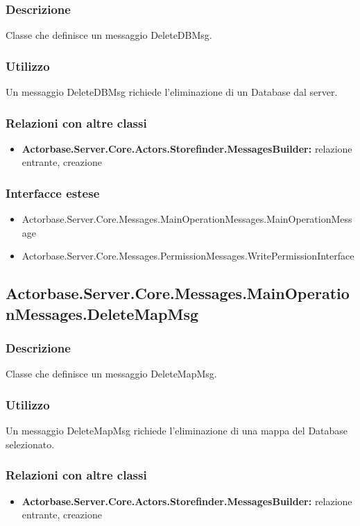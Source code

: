 \documentclass[a4paper]{article}
\begin{document}
			\subsubsection{Descrizione}
				Classe che definisce un messaggio DeleteDBMsg.
			\subsubsection{Utilizzo}
				Un messaggio DeleteDBMsg richiede l'eliminazione di un Database dal server.
			\subsubsection{Relazioni con altre classi}
			\begin{itemize}
				\item \textbf{Actorbase.Server.Core.Actors.Storefinder.MessagesBuilder:} relazione entrante, creazione
			\end{itemize}
			\subsubsection{Interfacce estese}
			\begin{itemize}
				\item Actorbase.Server.Core.Messages.MainOperationMessages.MainOperationMessage
				\item Actorbase.Server.Core.Messages.PermissionMessages.WritePermissionInterface
			\end{itemize}

			\subsection{Actorbase.Server.Core.Messages.MainOperationMessages.DeleteMapMsg}
			\subsubsection{Descrizione}
				Classe che definisce un messaggio DeleteMapMsg.
			\subsubsection{Utilizzo}
				Un messaggio DeleteMapMsg richiede l'eliminazione di una mappa del Database selezionato.
			\subsubsection{Relazioni con altre classi}
			\begin{itemize}
				\item \textbf{Actorbase.Server.Core.Actors.Storefinder.MessagesBuilder:} relazione entrante, creazione
			\end{itemize}
\end{document}

